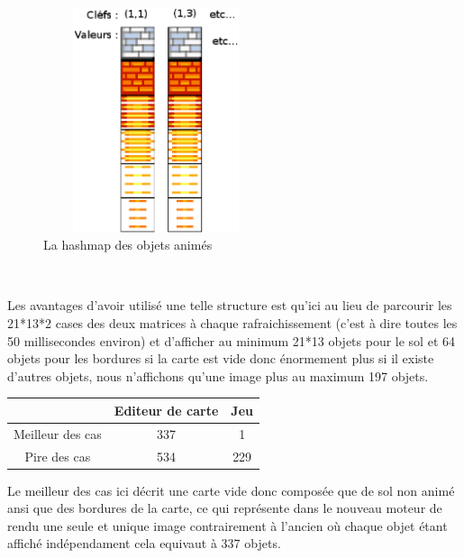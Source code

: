 			$\,$			

			\begin{figure}[!h]			
				\begin{center}						
					\includegraphics[width=250px, height=250px]{Developpement/Img/hashmap.eps}
					\caption{La hashmap des objets animés}
				\end{center}
			\end{figure}

			$\,$
			
			\newpage

			Les avantages d'avoir utilisé une telle structure est qu'ici au lieu de
			parcourir les 21*13*2 cases des deux matrices à chaque rafraichissement
			(c'est à dire toutes les 50 millisecondes environ) et d'afficher au minimum
			21*13 objets pour le sol et 64 objets pour les bordures si la carte est vide
			donc énormement plus si il existe d'autres objets, nous n'affichons qu'une
			image plus au maximum 197 objets.
			
			\begin{center}
				\begin{tabular}{|c|c|c|} \hline
				  & Editeur de carte & Jeu    \\\hline 
				Meilleur des cas & 337 & 1    \\\hline
				Pire des cas     & 534 & 229  \\\hline		
				\end{tabular}
			\end{center}
			
			Le meilleur des cas ici décrit une carte vide donc composée que de sol non
			animé ansi que des bordures de la carte, ce qui représente dans le nouveau
			moteur de rendu une seule et unique image contrairement à l'ancien où chaque
			objet étant affiché indépendament cela equivaut à 337 objets.
			
			$\,$
			
